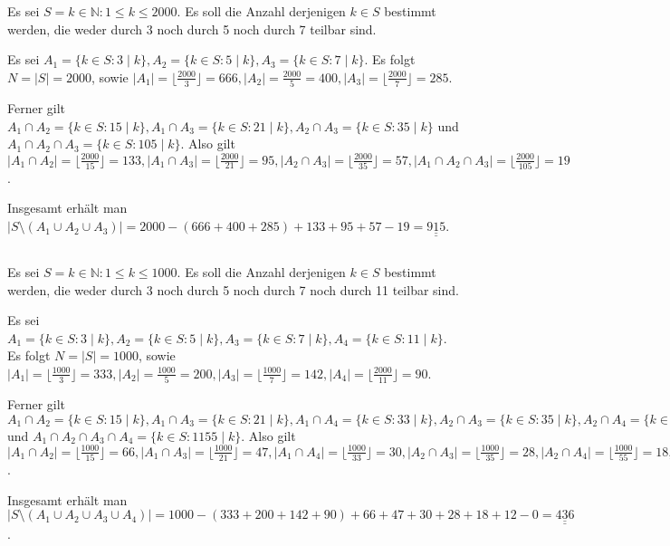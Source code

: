 \documentclass[10pt,a4paper,oneside,ngerman,numbers=noenddot]{scrartcl}
\begin{document}
\section{} %
\subsection{} %
Es sei $S = {k \in \mathbb{N} : 1 \leq k \leq 2000}$. Es soll die Anzahl derjenigen $k \in S$ bestimmt werden, die weder durch 3 noch durch 5 noch durch 7 teilbar sind.

Es sei $A_{1} = \{k \in S : 3 \mid k\}, A_{2} = \{k \in S : 5 \mid k\}, A_{3} = \{k \in S : 7 \mid k\}$. Es folgt $N = |S| = 2000$, sowie $|A_{1}| =  \lfloor\frac{2000}{3}\rfloor = 666, |A_{2}| = \frac{2000}{5} = 400, |A_{3}| = \lfloor\frac{2000}{7}\rfloor = 285$.

Ferner gilt $A_{1} \cap A_{2} = \{k \in S : 15 \mid k\}, A_{1} \cap A_{3} = \{k \in S : 21 \mid k\}, A_{2} \cap A_{3} = \{k \in S : 35 \mid k\}$ und $A_{1} \cap A_{2} \cap A_{3} = \{k \in S : 105 \mid k\}$. Also gilt $|A_{1} \cap A_{2}| = \lfloor\frac{2000}{15}\rfloor = 133, |A_{1} \cap A_{3}| = \lfloor\frac{2000}{21}\rfloor = 95, |A_{2} \cap A_{3}| = \lfloor\frac{2000}{35}\rfloor = 57, |A_{1} \cap A_{2} \cap A_{3}| = \lfloor\frac{2000}{105}\rfloor = 19$.

Insgesamt erhält man $|S \setminus (A_{1} \cup A_{2} \cup A_{3})| = 2000 - (666 + 400 + 285) + 133 + 95 + 57 - 19 = \underline{\underline{915}}$.
\subsection{} %
Es sei $S = {k \in \mathbb{N} : 1 \leq k \leq 1000}$. Es soll die Anzahl derjenigen $k \in S$ bestimmt werden, die weder durch 3 noch durch 5 noch durch 7 noch durch 11 teilbar sind.

Es sei $A_{1} = \{k \in S : 3 \mid k\}, A_{2} = \{k \in S : 5 \mid k\}, A_{3} = \{k \in S : 7 \mid k\}, A_{4} = \{k \in S : 11 \mid k\}$. Es folgt $N = |S| = 1000$, sowie $|A_{1}| =  \lfloor\frac{1000}{3}\rfloor = 333, |A_{2}| = \frac{1000}{5} = 200, |A_{3}| = \lfloor\frac{1000}{7}\rfloor = 142, |A_{4}| = \lfloor\frac{2000}{11}\rfloor = 90$.

Ferner gilt $A_{1} \cap A_{2} = \{k \in S : 15 \mid k\}, A_{1} \cap A_{3} = \{k \in S : 21 \mid k\}, A_{1} \cap A_{4} = \{k \in S : 33 \mid k\}, A_{2} \cap A_{3} = \{k \in S : 35 \mid k\}, A_{2} \cap A_{4} = \{k \in S : 55 \mid k\}, A_{3} \cap A_{4} = \{k \in S : 77 \mid k\}$ und $A_{1} \cap A_{2} \cap A_{3} \cap A_{4} = \{k \in S : 1155 \mid k\}$. Also gilt $|A_{1} \cap A_{2}| = \lfloor\frac{1000}{15}\rfloor = 66, |A_{1} \cap A_{3}| = \lfloor\frac{1000}{21}\rfloor = 47, |A_{1} \cap A_{4}| = \lfloor\frac{1000}{33}\rfloor = 30, |A_{2} \cap A_{3}| = \lfloor\frac{1000}{35}\rfloor = 28, |A_{2} \cap A_{4}| = \lfloor\frac{1000}{55}\rfloor = 18, |A_{3} \cap A_{4}| = \lfloor\frac{1000}{77}\rfloor = 12, |A_{1} \cap A_{2} \cap A_{3} \cap A_{4}| = \lfloor\frac{1000}{1155}\rfloor = 0$.

Insgesamt erhält man $|S \setminus (A_{1} \cup A_{2} \cup A_{3} \cup A_{4})| = 1000 - (333 + 200 + 142 + 90) + 66 + 47 + 30 +28 + 18 + 12 - 0 = \underline{\underline{436}}$.
\end{document}
